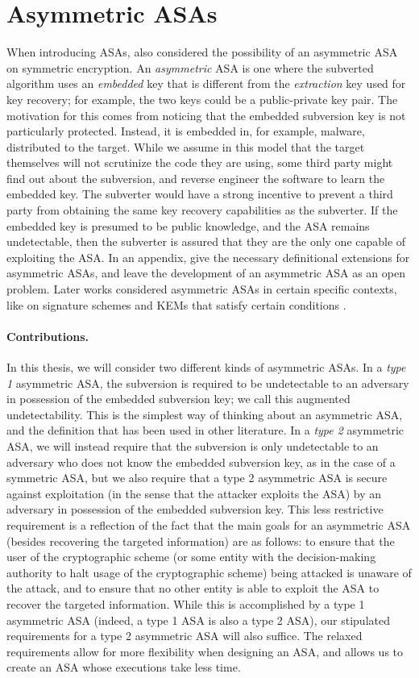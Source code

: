 \section{Asymmetric ASAs}
When introducing ASAs, \cite{C:BelPatRog14} also considered the possibility of an asymmetric ASA on symmetric encryption. An \emph{asymmetric} ASA is one where the subverted algorithm uses an \emph{embedded} key that is different from the \emph{extraction} key used for key recovery; for example, the two keys could be a public-private key pair. The motivation for this comes from noticing that the embedded subversion key is not particularly protected. Instead, it is embedded in, for example, malware, distributed to the target. While we assume in this model that the target themselves will not scrutinize the code they are using, some third party might find out about the subversion, and reverse engineer the software to learn the embedded key. The subverter would have a strong incentive to prevent a third party from obtaining the same key recovery capabilities as the subverter. If the embedded key is presumed to be public knowledge, and the ASA remains undetectable, then the subverter is assured that they are the only one capable of exploiting the ASA. In an appendix, \cite{C:BelPatRog14} give the necessary definitional extensions for asymmetric ASAs, and leave the development of an asymmetric ASA as an open problem. Later works considered asymmetric ASAs in certain specific contexts, like on signature schemes and KEMs that satisfy certain conditions \cite{AC:CheHuaYun20,BSKC2019}.

\paragraph{Contributions.}
In this thesis, we will consider two different kinds of asymmetric ASAs. In a \emph{type 1} asymmetric ASA, the subversion is required to be undetectable to an adversary in possession of the embedded subversion key; we call this augmented undetectability. This is the simplest way of thinking about an asymmetric ASA, and the definition that has been used in other literature. In a \emph{type 2} asymmetric ASA, we will instead require that the subversion is only undetectable to an adversary who does not know the embedded subversion key, as in the case of a symmetric ASA, but we also require that a type 2 asymmetric ASA is secure against exploitation (in the sense that the attacker exploits the ASA) by an adversary in possession of the embedded subversion key. This less restrictive requirement is a reflection of the fact that the main goals for an asymmetric ASA (besides recovering the targeted information) are as follows: to ensure that the user of the cryptographic scheme (or some entity with the decision-making authority to halt usage of the cryptographic scheme) being attacked is unaware of the attack, and to ensure that no other entity is able to exploit the ASA to recover the targeted information. While this is accomplished by a type 1 asymmetric ASA (indeed, a type 1 ASA is also a type 2 ASA), our stipulated requirements for a type 2 asymmetric ASA will also suffice. The relaxed requirements allow for more flexibility when designing an ASA, and allows us to create an ASA whose executions take less time.

